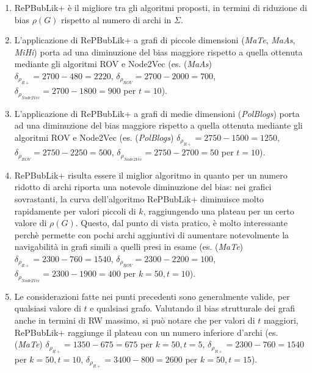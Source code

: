 \begin{enumerate}
    \item RePBubLik+ è il migliore tra gli algoritmi proposti, in termini di riduzione di bias $\rho(G)$ rispetto al numero di archi in $\Sigma$.
    \item L'applicazione di RePBubLik+ a grafi di piccole dimensioni (\emph{MaTe}, \emph{MaAs}, \emph{MiHi}) porta ad una diminuzione del bias maggiore rispetto a quella ottenuta mediante gli algoritmi ROV e Node2Vec (es. (\emph{MaAs}) $\delta_{\rho_{R+}}=2700-480=2220$, $\delta_{\rho_{ROV}}=2700-2000=700$, ${\delta_{\rho_{Node2Vec}}}=2700-1800=900$ per $t=10$).
    \item L'applicazione di RePBubLik+ a grafi di medie dimensioni (\emph{PolBlogs}) porta ad una diminuzione del bias maggiore rispetto a quella ottenuta mediante gli algoritmi ROV e Node2Vec (es. (\emph{PolBlogs}) $\delta_{\rho_{R+}}=2750-1500=1250$, $\delta_{\rho_{ROV}}=2750-2250=500$, ${\delta_{\rho_{Node2Vec}}}=2750-2700=50$ per $t=10$).
    \item RePBubLik+ risulta essere il miglior algoritmo in quanto per un numero ridotto di archi riporta una notevole diminuzione del bias: nei grafici sovrastanti, la curva dell'algoritmo RePBubLik+ diminuisce molto rapidamente per valori piccoli di $k$, raggiungendo una plateau per un certo valore di $\rho(G)$.
            Questo, dal punto di vista pratico, è molto interessante perchè permette con pochi archi aggiuntivi di aumentare notevolmente la navigabilità in grafi simili a quelli presi in esame (es. (\emph{MaTe}) $\delta_{\rho_{R+}}=2300-760=1540$, $\delta_{\rho_{ROV}}=2300-2200=100$, ${\delta_{\rho_{Node2Vec}}}=2300-1900=400$ per $k=50,t=10$).
    \item Le considerazioni fatte nei punti precedenti sono generalmente valide, per qualsiasi valore di $t$ e qualsiasi grafo. Valutando il bias strutturale dei grafi anche in termini di RW massimo, si può notare che per valori di $t$ maggiori, RePBubLik+ raggiunge il plateau con un numero inferiore d'archi (es. (\emph{MaTe}) $\delta_{\rho_{R+}}=1350-675=675$ per $k=50, t=5$,  $\delta_{\rho_{R+}}=2300-760=1540$ per $k=50,t=10$, $\delta_{\rho_{R+}}=3400-800=2600$ per $k=50,t=15$).
\end{enumerate}

